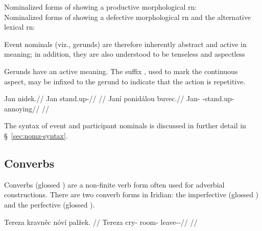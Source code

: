 \pex \a Nominalized forms of  showing a productive morphological {\sc rn}:\smallskip\\
\a Nominalized forms of  showing a defective morphological {\sc rn} and the alternative lexical {\sc rn}:\smallskip\\
	\xe


Event nominals (viz., gerunds) are therefore inherently abstract and active in
meaning; in addition, they are also understood to be tenseless and aspectless

Gerunds have an active meaning. The suffix , used to mark
the continuous aspect, may be infixed to the gerund to indicate that the action
is repetitive.

\pex
\a
\begingl
\gla Jan nidek.//
\glb Jan stand.up-//
\glft {}//
\endgl
\a
\begingl
\gla Janí ponidálou buvec.//
\glb Jan-\Gen{} -stand.up- annoying//
\glft {}//
\endgl
\xe

The syntax of event and participant nominals is discussed in further detail in
\S~\ref{sec:nomz-syntax}.

\subsection{Converbs}\label{sec:converb}

Converbs (glossed \Cv{}) are a non-finite verb form often used for adverbial
constructions. There are two converb forms in Iridian: the imperfective
 (glossed ) and the perfective
 (glossed ).

\pex
\begingl
\gla Tereza kravněc nóví palžek. //
\glb Tereza cry- room-\Gen{} leave-\Av{}-\Pf{}//
\glft {}//
\endgl
\xe

